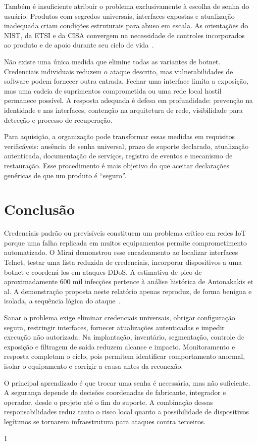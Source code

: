 \documentclass[11pt,a4paper]{article}
\begin{document}
Também é insuficiente atribuir o problema exclusivamente à escolha de senha do usuário. Produtos com segredos universais, interfaces expostas e atualização inadequada criam condições estruturais para abuso em escala. As orientações do NIST, da ETSI e da CISA convergem na necessidade de controles incorporados ao produto e de apoio durante seu ciclo de vida~\cite{nist8259a,etsi303645,cisa2023passwords}.

Não existe uma única medida que elimine todas as variantes de botnet. Credenciais individuais reduzem o ataque descrito, mas vulnerabilidades de software podem fornecer outra entrada. Fechar uma interface limita a exposição, mas uma cadeia de suprimentos comprometida ou uma rede local hostil permanece possível. A resposta adequada é defesa em profundidade: prevenção na identidade e nas interfaces, contenção na arquitetura de rede, visibilidade para detecção e processo de recuperação.

Para aquisição, a organização pode transformar essas medidas em requisitos verificáveis: ausência de senha universal, prazo de suporte declarado, atualização autenticada, documentação de serviços, registro de eventos e mecanismo de restauração. Esse procedimento é mais objetivo do que aceitar declarações genéricas de que um produto é ``seguro''.

\section{Conclusão}
Credenciais padrão ou previsíveis constituem um problema crítico em redes IoT porque uma falha replicada em muitos equipamentos permite comprometimento automatizado. O Mirai demonstrou esse encadeamento ao localizar interfaces Telnet, testar uma lista reduzida de credenciais, incorporar dispositivos a uma botnet e coordená-los em ataques DDoS. A estimativa de pico de aproximadamente 600 mil infecções pertence à análise histórica de Antonakakis et al. A demonstração proposta neste relatório apenas reproduz, de forma benigna e isolada, a sequência lógica do ataque~\cite{antonakakis2017}.

Sanar o problema exige eliminar credenciais universais, obrigar configuração segura, restringir interfaces, fornecer atualizações autenticadas e impedir execução não autorizada. Na implantação, inventário, segmentação, controle de exposição e filtragem de saída reduzem alcance e impacto. Monitoramento e resposta completam o ciclo, pois permitem identificar comportamento anormal, isolar o equipamento e corrigir a causa antes da reconexão.

O principal aprendizado é que trocar uma senha é necessária, mas não suficiente. A segurança depende de decisões coordenadas de fabricante, integrador e operador, desde o projeto até o fim do suporte. A combinação dessas responsabilidades reduz tanto o risco local quanto a possibilidade de dispositivos legítimos se tornarem infraestrutura para ataques contra terceiros.

\begin{spacing}{1}
\footnotesize


\end{spacing}
\end{document}
